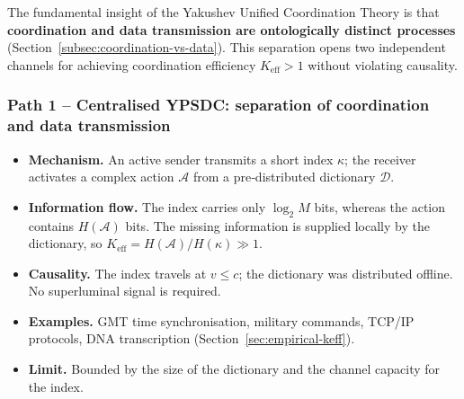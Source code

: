 \documentclass[11pt,a4paper]{article}
\begin{document}
The fundamental insight of the Yakushev Unified Coordination Theory is that
\textbf{coordination and data transmission are ontologically distinct processes}
(Section~\ref{subsec:coordination-vs-data}). This separation opens two
independent channels for achieving coordination efficiency
\(K_{\mathrm{eff}} > 1\) without violating causality.

\subsubsection*{Path 1 – Centralised YPSDC: separation of coordination and data transmission}
\begin{itemize}[leftmargin=*]
	\item \textbf{Mechanism.} An active sender transmits a short index \(\kappa\);
	the receiver activates a complex action \(\mathcal{A}\) from a pre‑distributed
	dictionary \(\mathcal{D}\).
	\item \textbf{Information flow.} The index carries only \(\log_2 M\) bits,
	whereas the action contains \(H(\mathcal{A})\) bits. The missing information
	is supplied locally by the dictionary, so
	\(K_{\mathrm{eff}} = H(\mathcal{A}) / H(\kappa) \gg 1\).
	\item \textbf{Causality.} The index travels at \(v \le c\); the dictionary
	was distributed offline. No superluminal signal is required.
	\item \textbf{Examples.} GMT time synchronisation, military commands,
	TCP/IP protocols, DNA transcription (Section~\ref{sec:empirical-keff}).
	\item \textbf{Limit.} Bounded by the size of the dictionary and the
	channel capacity for the index.
\end{itemize}
\end{document}
